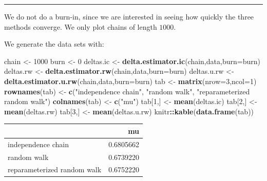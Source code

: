 \documentclass[
  11pt,
]{paper}
\newenvironment{Shaded}{\begin{snugshade}}{\end{snugshade}}
\newcommand{\AttributeTok}[1]{\textcolor[rgb]{0.13,0.29,0.53}{#1}}
\newcommand{\DecValTok}[1]{\textcolor[rgb]{0.00,0.00,0.81}{#1}}
\newcommand{\FunctionTok}[1]{\textcolor[rgb]{0.13,0.29,0.53}{\textbf{#1}}}
\newcommand{\NormalTok}[1]{#1}
\newcommand{\OtherTok}[1]{\textcolor[rgb]{0.56,0.35,0.01}{#1}}
\newcommand{\SpecialCharTok}[1]{\textcolor[rgb]{0.81,0.36,0.00}{\textbf{#1}}}
\newcommand{\StringTok}[1]{\textcolor[rgb]{0.31,0.60,0.02}{#1}}
\begin{document}
\begin{center}\rule{0.5\linewidth}{0.5pt}\end{center}

We do not do a burn-in, since we are interested in seeing how quickly
the three methods converge. We only plot chains of length \(1000\).

We generate the data sets with:

\begin{Shaded}
\begin{Highlighting}[]
\NormalTok{chain }\OtherTok{\textless{}{-}} \DecValTok{1000}
\NormalTok{burn }\OtherTok{\textless{}{-}} \DecValTok{0}
\NormalTok{deltas.ic }\OtherTok{\textless{}{-}} \FunctionTok{delta.estimator.ic}\NormalTok{(chain,data,}\AttributeTok{burn=}\NormalTok{burn)}
\NormalTok{deltas.rw }\OtherTok{\textless{}{-}} \FunctionTok{delta.estimator.rw}\NormalTok{(chain,data,}\AttributeTok{burn=}\NormalTok{burn)}
\NormalTok{deltas.u.rw }\OtherTok{\textless{}{-}} \FunctionTok{delta.estimator.u.rw}\NormalTok{(chain,data,}\AttributeTok{burn=}\NormalTok{burn)}
\NormalTok{tab }\OtherTok{\textless{}{-}} \FunctionTok{matrix}\NormalTok{(}\AttributeTok{nrow=}\DecValTok{3}\NormalTok{,}\AttributeTok{ncol=}\DecValTok{1}\NormalTok{)}
\FunctionTok{rownames}\NormalTok{(tab) }\OtherTok{\textless{}{-}} \FunctionTok{c}\NormalTok{(}\StringTok{"independence chain"}\NormalTok{,}
                   \StringTok{"random walk"}\NormalTok{,}
                   \StringTok{"reparameterized random walk"}\NormalTok{)}
\FunctionTok{colnames}\NormalTok{(tab) }\OtherTok{\textless{}{-}} \FunctionTok{c}\NormalTok{(}\StringTok{"mu"}\NormalTok{)}
\NormalTok{tab[}\DecValTok{1}\NormalTok{,] }\OtherTok{\textless{}{-}} \FunctionTok{mean}\NormalTok{(deltas.ic)}
\NormalTok{tab[}\DecValTok{2}\NormalTok{,] }\OtherTok{\textless{}{-}} \FunctionTok{mean}\NormalTok{(deltas.rw)}
\NormalTok{tab[}\DecValTok{3}\NormalTok{,] }\OtherTok{\textless{}{-}} \FunctionTok{mean}\NormalTok{(deltas.u.rw)}
\NormalTok{knitr}\SpecialCharTok{::}\FunctionTok{kable}\NormalTok{(}\FunctionTok{data.frame}\NormalTok{(tab))}
\end{Highlighting}
\end{Shaded}

\begin{longtable}[]{@{}lr@{}}
\toprule\noalign{}
& mu \\
\midrule\noalign{}
\endhead
\bottomrule\noalign{}
\endlastfoot
independence chain & 0.6805662 \\
random walk & 0.6739220 \\
reparameterized random walk & 0.6752220 \\
\end{longtable}
\end{document}
